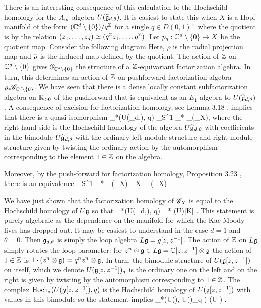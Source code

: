 There is an interesting consequence of this calculation to the Hochschild homology for the $A_\infty$ algebra $U(\Hat{\fg}_{d,\theta})$.
It is easiest to state this when $X$ is a Hopf manifold of the form $(\CC^d \setminus \{0\}) / q^\ZZ$ for a single $q \in D(0,1)^\times$ where the quotient is by the relation $(z_1,\ldots,z_d) \simeq (q^\ZZ z_1,\ldots,q^\ZZ)$.
Let $p_q :  \CC^d \setminus \{0\} \to X$ be the quotient map.
Consider the following diagram
\ben
{}
\een
Here, $\rho$ is the radial projection map and $\Bar{\rho}$ is the induced map defined by the quotient.
The action of $\ZZ$ on $\CC^d \setminus\{0\}$ gives $\sG_{\CC^d \setminus \{0\}}$ the structure of a $\ZZ$-equivariant factorization algebra. 
In turn, this determines an action of $\ZZ$ on pushforward factorization algebra $\rho_* \sG_{\CC^d \setminus \{0\}}$.
We have seen that there is a dense locally constant subfactorization algebra on $\RR_{>0}$ of the pushforward that is equivalent as an $E_1$ algebra to $U(\Hat{\fg}_{d,\theta})$.
A consequence of excision for factorization homology, see Lemma 3.18 \cite{AFT1}, implies that there is a quasi-isomorphism
\ben
\Hoch_*(U(\Hat{\fg}_{d,\theta}), q) \simeq \int_{S^1} \Bar{\rho}_* \UU_\alpha(\sG_X),
\een
where the right-hand side is the Hochschild homology of the algebra $U \Hat{\fg}_{d,\theta}$ with coefficients in the bimodule $U \Hat{\fg}_{d, \theta}$ with the ordinary left-module structure and right-module structure given by twisting the ordinary action by the automorphism corresponding to the element $1 \in \ZZ$ on the algebra.

Moreover, by the push-forward for factorization homology, Proposition 3.23 \cite{AFT1}, there is an equivalence
\ben
\int_{S^1} \Bar{\rho}_* \UU_\alpha(\sG_X) \xto{\simeq} \int_X \UU_{\alpha} (\sG_X) .
\een

We have just shown that the factorization homology of $\sG_X$ is equal to the Hochschild homology of $U\fg$ so that
\ben
\Hoch_*(U(\Hat{\fg}_{d,\theta}), q) \simeq \Hoch_* (U\fg)[K] .
\een
This statement is purely algebraic as the dependence on the manifold for which the Kac-Moody lives has dropped out.
It may be easiest to understand in the case $d=1$ and $\theta = 0$. 
Then $\fg_{d,\theta}$ is simply the loop algebra $L\fg = g [z,z^{-1}]$. 
The action of $\ZZ$ on $L\fg$ simply rotates the loop parameter: for $z^n \tensor \fg \in L \fg = \CC[z,z^{-1}] \tensor \fg$ the action of $1 \in \ZZ$ is $1 \cdot (z^n \tensor \fg) = q^n z^n \tensor \fg$. 
In turn, the bimodule structure of $U(\fg[z,z^{-1}])$ on itself, which we denote $U(\fg[z,z^{-1}])_q$ is the ordinary one on the left and on the right is given by twisting by the automorphism corresponding to $1 \in \ZZ$. 
The complex $\Hoch_*(U(g[z,z^{-1}]), q)$ is the Hochschild homology of $U(\fg[z,z^{-1}])$ with values in this bimodule so the statement implies
\ben
\Hoch_*\left(U(\fg[z,z^{-1}]), U(\fg[z,z^{-1}])_q \right) \simeq \Hoch(U \fg) . 
\een

